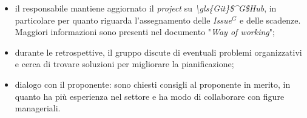 \begin{itemize}
\begin{itemize}
		      \item il responsabile mantiene aggiornato il \textit{project} su
		            \textit{\gls{\gls{Git}$^G$Hub}}, in particolare per quanto riguarda
		            l'assegnamento delle \textit{\gls{Issue}$^G$} e delle scadenze.
		            Maggiori informazioni sono presenti nel documento
		            "\textit{Way of working}";

		      \item durante le retrospettive, il gruppo discute di eventuali
		            problemi organizzativi e cerca di trovare soluzioni per
		            migliorare la pianificazione;

		      \item dialogo con il proponente: sono chiesti consigli al
		            proponente in merito, in quanto ha più esperienza
		            nel settore e ha modo di collaborare con figure manageriali.
	      \end{itemize}
\end{itemize}
